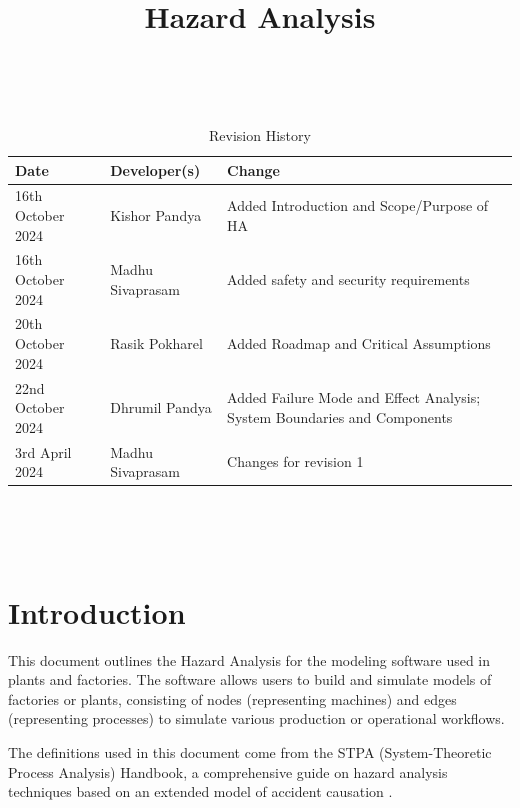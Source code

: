 \documentclass{article}
\title{Hazard Analysis\\\progname}
\author{\authname}
\date{}
\begin{document}
\maketitle
\thispagestyle{empty}

~\newpage


\begin{table}[hp]
\caption{Revision History} \label{TblRevisionHistory}
\begin{tabularx}{\textwidth}{llX}
\toprule
\textbf{Date} & \textbf{Developer(s)} & \textbf{Change}\\
\midrule
16th October 2024 & Kishor Pandya & Added Introduction and Scope/Purpose of HA\\
16th October 2024 & Madhu Sivaprasam & Added safety and security requirements\\
20th October 2024 & Rasik Pokharel & Added Roadmap and Critical Assumptions\\
22nd October 2024 & Dhrumil Pandya & Added Failure Mode and Effect Analysis; System Boundaries and Components\\
3rd April 2024 & Madhu Sivaprasam & Changes for revision 1\\
\bottomrule
\end{tabularx}
\end{table}

~\newpage

\tableofcontents

~\newpage


\section{Introduction}

This document outlines the Hazard Analysis for the modeling software used in plants and factories. The software allows users to build and simulate models of factories or plants, consisting of nodes (representing machines) and edges (representing processes) to simulate various production or operational workflows.

The definitions used in this document come from the STPA (System-Theoretic Process Analysis) Handbook, a comprehensive guide on hazard analysis techniques based on an extended model of accident causation \cite{Leveson2018}.
\end{document}
